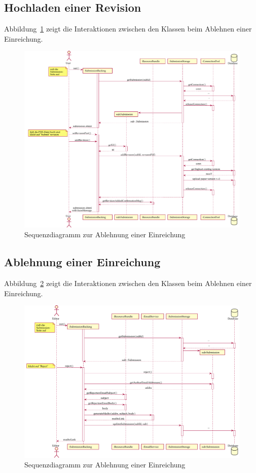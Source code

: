 
\subsection{Hochladen einer Revision}\label{subsec:sequenz-revision-hochladen}

Abbildung~\ref{fig:upload-revision-sequence} zeigt die Interaktionen zwischen den Klassen beim Ablehnen einer Einreichung.

\begin{figure}
    \centering
    \includegraphics[width=\textwidth]{graphics/upload_revision}
    \caption{Sequenzdiagramm zur Ablehnung einer Einreichung}
    \label{fig:upload-revision-sequence}
\end{figure}

\subsection{Ablehnung einer Einreichung}\label{subsec:sequenz-ablehnung}

Abbildung~\ref{fig:rejection-sequence} zeigt die Interaktionen zwischen den Klassen beim Ablehnen einer Einreichung.

\begin{figure}
    \centering
    \includegraphics[width=\textwidth]{graphics/reject_submission}
    \caption{Sequenzdiagramm zur Ablehnung einer Einreichung}
    \label{fig:rejection-sequence}
\end{figure}
